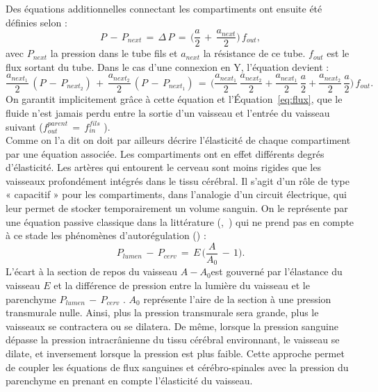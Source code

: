 Des équations additionnelles connectant les compartiments ont ensuite été définies selon :
\begin{equation}
P \,-\,P_{next}\,=\,\Delta\,P\,=\,\biggl(\frac{a}{2}\,+\,\frac{a_{next}}{2}\biggr)\,f_{out},
\end{equation}
avec $P_{next}$ la pression dans le tube fils et $a_{next}$ la résistance de ce tube. $f_{out}$ est le flux sortant du
tube. Dans le cas d’une connexion en Y, l’équation devient :
\begin{equation}
\frac{a_{next_1}}{2}\,(P\,-\,P_{next_2})\,+\,\frac{a_{next_2}}{2}\,(P\,-\,P_{next_1})\,=\,\biggl(\frac{a_{next_1}}{2}\,\frac{a_{next_2}}{2}+\frac{a_{next_1}}{2}\,\frac{a}{2}+\frac{a_{next_2}}{2}\,\frac{a}{2}\biggr)\,f_{out}.
\end{equation}
On garantit implicitement grâce à cette équation et l’Équation~\ref{eq:flux}, que le fluide n’est jamais perdu
entre la sortie d’un vaisseau et l’entrée du vaisseau suivant ($f_{out}^{parent}\, = \, f_{in}^{fils}$ ).\\
Comme on l’a dit on doit par ailleurs décrire l’élasticité de chaque compartiment par une
équation associée. Les compartiments ont en effet différents degrés d’élasticité. Les artères qui
entourent le cerveau sont moins rigides que les vaisseaux profondément intégrés dans le tissu
cérébral. Il s’agit d’un rôle de type « capacitif » pour les compartiments, dans l’analogie d’un circuit
électrique, qui leur permet de stocker temporairement un volume sanguin. On le représente par une
équation passive classique dans la littérature  (\cite{Zagzoule1986},~\cite{Linninger2009}) qui ne prend pas en compte à ce stade les
phénomènes d’autorégulation (\cite{Paulson1990}) :
\begin{equation}
P_{lumen}\,-\,P_{cerv}\,=\,E\,\biggl(\frac{A}{A_0}\,-\,1\biggr).
\end{equation}
L’écart à la section de repos du vaisseau $A-A_0 $est gouverné par l’élastance du vaisseau $E$ et la
différence de pression entre la lumière du vaisseau et le parenchyme $P_{lumen}\,-\,P_{cerv}$ . $A_0$
représente l’aire de la section à une pression transmurale nulle. Ainsi, plus la pression transmurale
sera grande, plus le vaisseaux se contractera ou se dilatera. De même, lorsque la pression sanguine
dépasse la pression intracrânienne du tissu cérébral environnant, le vaisseau se dilate, et inversement
lorsque la pression est plus faible. Cette approche permet de coupler les équations de flux sanguines
et cérébro-spinales avec la pression du parenchyme en prenant en compte l’élasticité du vaisseau.\\
